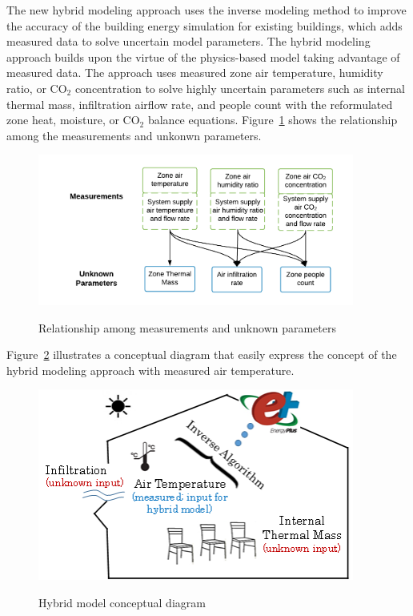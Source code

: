 The new hybrid modeling approach uses the inverse modeling method to improve the accuracy of the building energy simulation for existing buildings, which adds measured data to solve uncertain model parameters. The hybrid modeling approach builds upon the virtue of the physics-based model taking advantage of measured data. The approach uses measured zone air temperature, humidity ratio, or CO$_2$ concentration to solve highly uncertain parameters such as internal thermal mass, infiltration airflow rate, and people count with the reformulated zone heat, moisture, or CO$_2$ balance equations. Figure~\ref{fig:hybrid-model-solution-diagram} shows the relationship among the measurements and unkonwn parameters. 

\begin{figure}[h]
\begin{center}
\includegraphics[width=295pt]{media/img_HybridModel-0.png}
\caption{Relationship among measurements and unknown parameters}\protect \label{fig:hybrid-model-solution-diagram}
\end{center}
\end{figure}


Figure~\ref{fig:hybrid-model-conceptual-diagram} illustrates a conceptual diagram that easily express the concept of the hybrid modeling approach with measured air temperature. 

\begin{figure}[h]
\begin{center}
\includegraphics[width=295pt]{media/img_HybridModel-1.png}
\caption{Hybrid model conceptual diagram}\protect \label{fig:hybrid-model-conceptual-diagram}
\end{center}
\end{figure}




